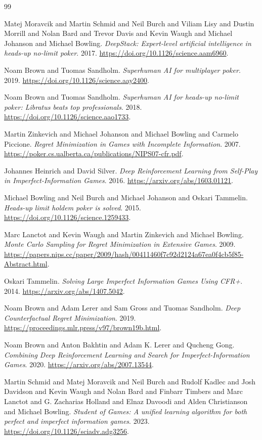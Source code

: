 \begin{thebibliography}{99}

 Matej Moravcik and Martin Schmid and Neil Burch and Viliam Lisy and Dustin Morrill and Nolan Bard and Trevor Davis and Kevin Waugh and Michael Johanson and Michael Bowling. \emph{DeepStack: Expert-level artificial intelligence in heads-up no-limit poker}. 2017. \url{https://doi.org/10.1126/science.aam6960}.

 Noam Brown and Tuomas Sandholm. \emph{Superhuman AI for multiplayer poker}. 2019. \url{https://doi.org/10.1126/science.aay2400}.

 Noam Brown and Tuomas Sandholm. \emph{Superhuman AI for heads-up no-limit poker: Libratus beats top professionals}. 2018. \url{https://doi.org/10.1126/science.aao1733}.

 Martin Zinkevich and Michael Johanson and Michael Bowling and Carmelo Piccione. \emph{Regret Minimization in Games with Incomplete Information}. 2007. \url{https://poker.cs.ualberta.ca/publications/NIPS07-cfr.pdf}.

 Johannes Heinrich and David Silver. \emph{Deep Reinforcement Learning from Self-Play in Imperfect-Information Games}. 2016. \url{https://arxiv.org/abs/1603.01121}.

 Michael Bowling and Neil Burch and Michael Johanson and Oskari Tammelin. \emph{Heads-up limit holdem poker is solved}. 2015. \url{https://doi.org/10.1126/science.1259433}.

 Marc Lanctot and Kevin Waugh and Martin Zinkevich and Michael Bowling. \emph{Monte Carlo Sampling for Regret Minimization in Extensive Games}. 2009. \url{https://papers.nips.cc/paper/2009/hash/00411460f7c92d2124a67ea0f4cb5f85-Abstract.html}.

 Oskari Tammelin. \emph{Solving Large Imperfect Information Games Using CFR+}. 2014. \url{https://arxiv.org/abs/1407.5042}.

 Noam Brown and Adam Lerer and Sam Gross and Tuomas Sandholm. \emph{Deep Counterfactual Regret Minimization}. 2019. \url{https://proceedings.mlr.press/v97/brown19b.html}.

 Noam Brown and Anton Bakhtin and Adam K. Lerer and Qucheng Gong. \emph{Combining Deep Reinforcement Learning and Search for Imperfect-Information Games}. 2020. \url{https://arxiv.org/abs/2007.13544}.

 Martin Schmid and Matej Moravcik and Neil Burch and Rudolf Kadlec and Josh Davidson and Kevin Waugh and Nolan Bard and Finbarr Timbers and Marc Lanctot and G. Zacharias Holland and Elnaz Davoodi and Alden Christianson and Michael Bowling. \emph{Student of Games: A unified learning algorithm for both perfect and imperfect information games}. 2023. \url{https://doi.org/10.1126/sciadv.adg3256}.


\end{thebibliography}
